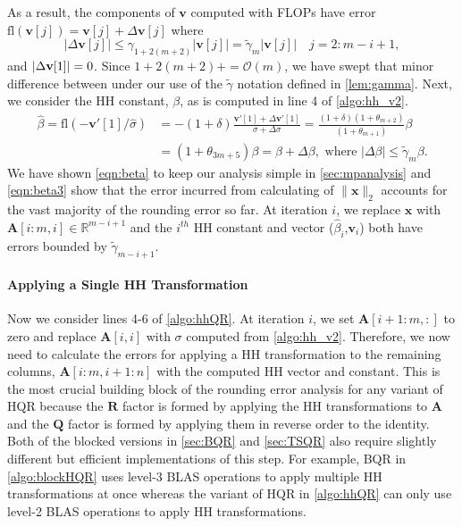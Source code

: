\documentclass[review,onefignum,onetabnum]{siamart190516}
\newcommand{\R}{\mathbb{R}}
\newcommand{\dd}{\delta}
\newcommand{\tth}{\theta}
\newcommand{\bb}[1]{\mathbf{#1}}
\newcommand{\fl}{\mathrm{fl}}
\newcommand{\cO}{\mathcal{O}}
\begin{document}
As a result, the components of $\bb{v}$ computed with FLOPs have error $\fl(\bb{v}[j])	= \bb{v}[j] + \Delta \bb{v}[j]$ where 
\begin{equation}
|\Delta \bb{v}[j]|\leq \gamma_{1+2(m+2)}|\bb{v}[j]| =\tilde{\gamma}_{m}|\bb{v}[j]|\quad j=2:m-i+1,\label{eqn:vbound}
\end{equation}
and $|\Delta {\bf v}[1]| = 0$.
Since $1+2(m+2) += \cO(m)$, we have swept that minor difference between under our use of the $\tilde{\gamma}$ notation defined in \cref{lem:gamma}.
Next, we consider the HH constant, $\beta$, as is computed in line 4 of \cref{algo:hh_v2}.
\begin{align}
\hat{\beta} = \fl\left(-\bb{v}'[1]/\hat{\sigma}\right) &=-(1+\dd)\frac{\bb{v}'[1]+\Delta \bb{v}'[1]}{\sigma + \Delta\sigma} = \frac{(1+\dd)(1+\tth_{m+2})}{(1+\tth_{m+1})}\beta \label{eqn:beta}\\
&= (1+\tth_{3m+5})\beta= \beta + \Delta \beta,\text{ where } |\Delta\beta| \leq \tilde{\gamma}_{m} \beta\label{eqn:beta3}.
\end{align}
We have shown \cref{eqn:beta} to keep our analysis simple in \cref{sec:mpanalysis} and \cref{eqn:beta3} show that the error incurred from calculating of $\|\bb{x}\|_2$ accounts for the vast majority of the rounding error so far.
At iteration $i$, we replace $\bb{x}$ with $\bb{A}[i:m,i]\in\R^{m-i+1}$ and the $i^{th}$ HH constant and vector ($\hat{\beta}_i$,$\bb{v}_i$) both have errors bounded by $\tilde{\gamma}_{m-i+1}$.
\paragraph{Applying a Single HH Transformation}
Now we consider lines 4-6 of \cref{algo:hhQR}.
At iteration $i$, we set $\bb{A}[i+1:m,:]$ to zero and replace $\bb{A}[i,i]$ with $\sigma$ computed from \cref{algo:hh_v2}.
Therefore, we now need to calculate the errors for applying a HH transformation to the remaining columns, $\bb{A}[i:m, i+1:n]$ with the computed HH vector and constant.
This is the most crucial building block of the rounding error analysis for any variant of HQR because the $\bb{R}$ factor is formed by applying the HH transformations to $\bb{A}$ and the $\bb{Q}$ factor is formed by applying them in reverse order to the identity.
Both of the blocked versions in \cref{sec:BQR} and \cref{sec:TSQR} also require slightly different but efficient implementations of this step.
For example, BQR in \cref{algo:blockHQR} uses level-3 BLAS operations to apply multiple HH transformations at once whereas the variant of HQR in \cref{algo:hhQR} can only use level-2 BLAS operations to apply HH transformations.\par
\end{document}
